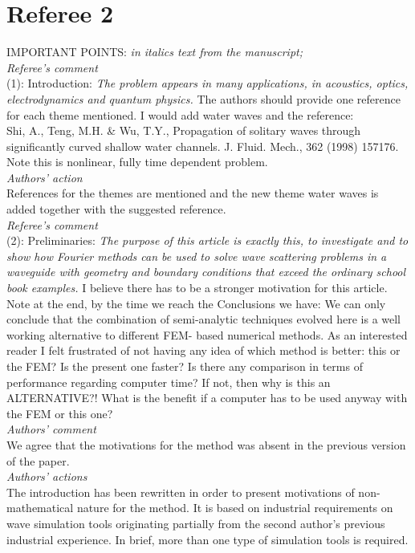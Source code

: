 \documentclass[a4paper,12pt]{article}%
\begin{document}
\section*{Referee 2}

IMPORTANT POINTS: \textit{in italics text from the manuscript;}\\
{\it Referee's comment}\\
(1): Introduction: \textit{The problem appears in many applications,
  in acoustics, optics, electrodynamics and quantum physics.} The
authors should provide one reference for each
theme mentioned. I would add water waves and the reference:\\
Shi, A., Teng, M.H. \& Wu, T.Y., Propagation of solitary waves through
significantly
curved shallow water channels. J. Fluid. Mech., 362 (1998) 157176.\\
Note this is nonlinear, fully time dependent problem.\\
{\it Authors' action}\\
References for the themes are mentioned and the new theme water waves
is added together with the suggested reference.\\
\newline
{\it Referee's comment}\\
(2): Preliminaries: \textit{The purpose of this article is exactly
  this, to investigate and to show how Fourier methods can be used to
  solve wave scattering problems in a waveguide with geometry and
  boundary conditions that exceed the ordinary school book examples.}
I believe there has to be a stronger motivation for this article. Note
at the end, by the time we reach the Conclusions we have: We can only
conclude that the combination of semi-analytic techniques evolved here
is a well working alternative to different FEM- based numerical
methods. As an interested reader I felt frustrated of not having any
idea of which method is better: this or the FEM? Is the present one
faster? Is there any comparison in terms of performance regarding
computer time? If not, then why is this an ALTERNATIVE?! What is the
benefit if a computer has to be used anyway with
the FEM or this one?\\
{\it Authors' comment}\\
We agree that the motivations for the method was absent in the
previous version of the paper.\\
{\it Authors' actions}\\
The introduction has been rewritten in order to present motivations of
non-mathematical nature for the method. It is based on industrial
requirements on wave simulation tools originating partially from the
second author's previous industrial experience. In brief, more than
one type of simulation tools is required.
\end{document}
